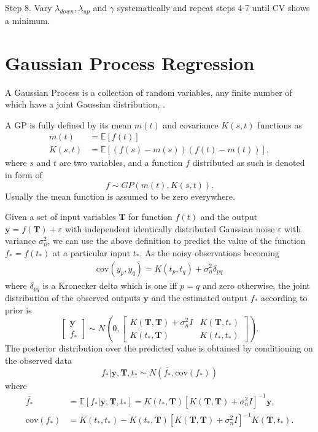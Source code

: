 Step 8. Vary  $\lambda_{down}, \lambda_{up}$ and $\gamma$ systematically and repeat steps 4-7 until CV shows a minimum.


\section{Gaussian Process Regression}

A Gaussian Process is a collection of random variables, any finite number of which have a joint Gaussian distribution, \cite{b_gpml}.

A GP is fully defined by its mean $m(t)$ and covariance $K(s,t)$ functions as
\begin{align}
m(t)&=\mathbb{E}[f(t)] \\
K(s,t)&=\mathbb{E}[(f(s)-m(s)) (f(t)-m(t))],
\end{align}
where $s$ and $t$ are two variables, and a function $f$ distributed as such is denoted in form of
\begin{equation}
f \sim GP(m(t),K(s,t)).
\end{equation}
Usually the mean function is assumed to be zero everywhere. 

Given a set of input variables $\mathbf{T}$ for function $f(t)$ and the output $\mathbf{y}=f(\mathbf{T})+\varepsilon$ with independent identically distributed Gaussian noise $\varepsilon$ with variance $\sigma_n^2$,  we can use the above definition to predict the value of the function $f_*=f(t_*)$ at a particular input $t_*$. As the noisy observations becoming
\begin{align}\label{covdef}
\text{cov}(y_p,y_q) = K(t_p,t_q)+\sigma_n^2 \delta_{pq}
\end{align}
where $\delta_{pq}$ is a Kronecker delta which is one iff $p=q$ and zero otherwise, the joint distribution of the observed outputs $\mathbf{y}$ and the estimated output $f_*$ according to prior is
\begin{equation}
\left[ \begin{matrix}
\mathbf{y}\\
f_*
\end{matrix} \right] \sim N \left(  
0,\left[   \begin{matrix}
K(\mathbf{T},\mathbf{T}) +\sigma_n^2I& K(\mathbf{T},t_*) \\
K(t_*,\mathbf{T}) & K(t_*,t_*)
\end{matrix}  \right] 
\right).
\end{equation}
The posterior distribution over the predicted value is obtained by conditioning on the observed data
\begin{equation}
f_* | \mathbf{y},\mathbf{T},t_* \sim N(\bar{f_*},\text{cov}(f_*))
\end{equation}
where 
\begin{align}
\bar{f_*}&=\mathbb{E}[f_* | \mathbf{y},\mathbf{T},t_* ]=K(t_*,\mathbf{T})[K(\mathbf{T},\mathbf{T})+\sigma_n^2I]^{-1}\mathbf{y},\\
\text{cov}(f_*)&=K(t_*,t_*)-K(t_*,\mathbf{T})[K(\mathbf{T},\mathbf{T})+\sigma_n^2I]^{-1}K(\mathbf{T},t_*).
\end{align}


